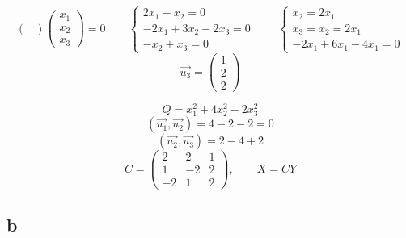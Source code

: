 \begin{itemize}
$$\begin{pmatrix}
    \end{pmatrix}
    \begin{pmatrix}
    	x_1 \\
        x_2 \\
        x_3
    \end{pmatrix} = 0 \qquad
    \begin{cases}
    	2x_1 - x_2 = 0 \\
        -2x_1 + 3x_2 - 2x_3 = 0 \\
        -x_2 + x_3 = 0
    \end{cases} \qquad
    \begin{cases}
    	x_2 = 2x_1 \\
        x_3 = x_2 = 2x_1 \\
        -2x_1 + 6x_1 - 4x_1 = 0
    \end{cases} $$
    $$ \vec{u_3} =
    \begin{pmatrix}
    	1 \\
        2 \\
        2
    \end{pmatrix} $$
\end{itemize}
$$ Q = x_1^2 + 4x_2^2 - 2x_3^2 $$
$$ (\vec{u_1}, \vec{u_2}) = 4 - 2 - 2 = 0 $$
$$ (\vec{u_2}, \vec{u_3}) = 2 - 4 + 2 $$
$$ C =
\begin{pmatrix}
	2 & 2 & 1 \\
    1 & -2 & 2 \\
    -2 & 1 & 2
\end{pmatrix}, \qquad X = CY $$

\subsection{b}

